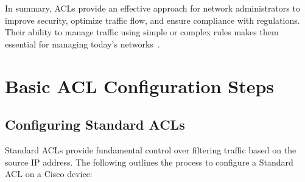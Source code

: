 \documentclass[11pt,a4paper]{article}
\begin{document}
        In summary, ACLs provide an effective approach for network administrators to improve security, optimize traffic flow, and ensure compliance with regulations. Their ability to manage traffic using simple or complex rules makes them essential for managing today’s networks~\cite{Implementing}.

\section*{Basic ACL Configuration Steps}
    \subsection*{Configuring Standard ACLs}
    Standard ACLs provide fundamental control over filtering traffic based on the source IP address. The following outlines the process to configure a Standard ACL on a Cisco device:
  
\end{document}
